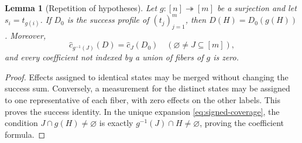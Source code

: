 \documentclass[10pt,a4paper]{amsart}
\newtheorem{lemma}[theorem]{Lemma}
\newcommand{\1}{\mathbf 1}
\begin{document}
\begin{lemma}[Repetition of hypotheses]\label{lem:cloning}
Let $g:[n]\twoheadrightarrow[m]$ be a surjection and let $s_i=t_{g(i)}$.
If $D_0$ is the success profile of $(t_j)_{j=1}^m$, then
$D(H)=D_0(g(H))$. Moreover,
\begin{equation}\label{eq:cloning-coefficients}
 \widehat c_{g^{-1}(J)}(D)=\widehat c_J(D_0)
 \quad(\varnothing\ne J\subseteq[m]),
\end{equation}
and every coefficient not indexed by a union of fibers of $g$ is zero.
\end{lemma}
\begin{proof}
Effects assigned to identical states may be merged without changing the
success sum. Conversely, a measurement for the distinct states may be
assigned to one representative of each fiber, with zero effects on the other
labels. This proves the success identity. In the unique expansion
\eqref{eq:signed-coverage}, the condition $J\cap g(H)\ne\varnothing$ is exactly
$g^{-1}(J)\cap H\ne\varnothing$, proving the coefficient formula.
\end{proof}
\end{document}
